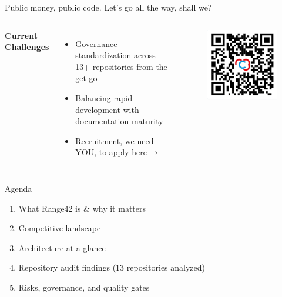 \documentclass[aspectratio=169]{beamer}
\begin{document}
\begin{frame}{Public money, public code. Let's go all the way, shall we?}
  \begin{columns}[T]
    \textbf{Current Challenges}
    \begin{itemize}
      \item Governance standardization across 13+ repositories from the get go
      \item Balancing rapid development with documentation maturity
      \item Recruitment, we need YOU, to apply here →
    \end{itemize}
    
    \vspace{10mm}
    \begin{figure}
      \centering
      \includegraphics[width=\textwidth]{images/work-with-us-qrcode.png}
    \end{figure}
  \end{columns}
\end{frame}

\begin{frame}{Agenda}
  \begin{enumerate}
    \item What Range42 is \& why it matters
    \item Competitive landscape
    \item Architecture at a glance
    \item Repository audit findings (13 repositories analyzed)
    \item Risks, governance, and quality gates
  \end{enumerate}
\end{frame}
\end{document}
